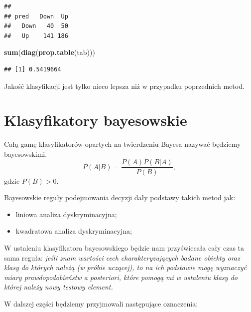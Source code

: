 \documentclass[
]{book}
\newenvironment{Shaded}{\begin{snugshade}}{\end{snugshade}}
\newcommand{\FunctionTok}[1]{\textcolor[rgb]{0.13,0.29,0.53}{\textbf{#1}}}
\newcommand{\NormalTok}[1]{#1}
\providecommand{\tightlist}{%
  \setlength{\itemsep}{0pt}\setlength{\parskip}{0pt}}
\theoremstyle{plain}
\theoremstyle{definition}
\theoremstyle{definition}
\theoremstyle{definition}
\theoremstyle{definition}
\theoremstyle{definition}
\theoremstyle{remark}
\begin{document}
\begin{verbatim}
##       
## pred   Down  Up
##   Down   40  50
##   Up    141 186
\end{verbatim}

\begin{Shaded}
\begin{Highlighting}[]
\FunctionTok{sum}\NormalTok{(}\FunctionTok{diag}\NormalTok{(}\FunctionTok{prop.table}\NormalTok{(tab)))}
\end{Highlighting}
\end{Shaded}

\begin{verbatim}
## [1] 0.5419664
\end{verbatim}

Jakość klasyfikacji jest tylko nieco lepsza niż w przypadku poprzednich metod.

\chapter{Klasyfikatory bayesowskie}\label{bayes}

Całą gamę klasyfikatorów opartych na twierdzeniu Bayesa nazywać będziemy bayesowskimi.
\begin{equation}\label{bayes}
        P(A|B)=\frac{P(A)P(B|A)}{P(B)},
\end{equation}
gdzie \(P(B)>0\).

Bayesowskie reguły podejmowania decyzji dały podstawy takich metod jak:

\begin{itemize}
\tightlist
\item
  liniowa analiza dyskryminacyjna;
\item
  kwadratowa analiza dyskryminacyjna;
\end{itemize}

W ustaleniu klasyfikatora bayesowskiego będzie nam przyświecała cały czas ta sama reguła: \emph{jeśli znam wartości cech charakteryzujących badane obiekty oraz klasy do których należą (w próbie uczącej), to na ich podstawie mogę wyznaczyć miary prawdopodobieństw a posteriori, które pomogą mi w ustaleniu klasy do której należy nowy testowy element.}

W dalszej części będziemy przyjmowali następujące oznaczenia:
\end{document}
